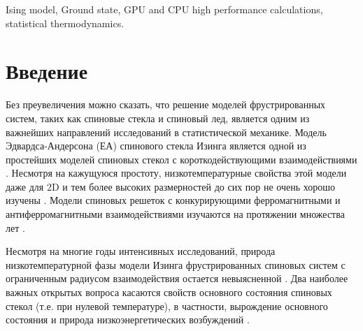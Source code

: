 \documentclass[utf8, babel, sor, jor, amsmath, amssymb, reprint]{elsarticle} %
\begin{document}
\begin{frontmatter}
\begin{keyword}
	Ising model, Ground state, GPU and CPU high performance calculations, statistical thermodynamics.
\end{keyword}


\end{frontmatter}

\linenumbers

\newpage
\tableofcontents

\newpage
\section{Введение}

Без преувеличения можно сказать, что решение моделей фрустрированных систем, таких как спиновые стекла и спиновый лед, является одним из важнейших направлений исследований в статистической механике. Модель Эдвардса-Андерсона (ЕА) спинового стекла Изинга является одной из простейших моделей спиновых стекол с короткодействующими взаимодействиями \cite{edwards1975theory}. Несмотря на кажущуюся простоту, низкотемпературные свойства этой модели даже для 2D и тем более высоких размерностей до сих пор не очень хорошо изучены \cite{pal1996ground, hartmann2011ground, newman2022ground}. Модели спиновых решеток с конкурирующими ферромагнитными и антиферромагнитными взаимодействиями изучаются на протяжении множества лет \cite{binder1986spin,mezard1987spin,  lebrecht2004plaquette, valdes2012j, lebrecht2015j, fan2023searching}. 

Несмотря на многие годы интенсивных исследований, природа низкотемпературной фазы модели Изинга фрустрированных спиновых систем с ограниченным радиусом взаимодействия остается невыясненной \cite{roma2010ground, newman2023proof}. Два наиболее важных открытых вопроса касаются свойств основного состояния спиновых стекол (т.е. при нулевой температуре), в частности, вырождение основного состояния и природа низкоэнергетических возбуждений \cite{newman2022ground}.  
\end{document}
